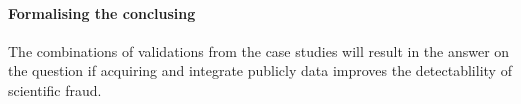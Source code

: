 \documentclass{ou-report}
\newcommand{\outline}[1]{{\color{blue} #1}}
\begin{document}
\paragraph{Formalising the conclusing}
The combinations of validations from the case studies will result in the
answer on the question if acquiring and integrate publicly data improves
the detectablility of scientific fraud.


    
    
    
    
    
    

    
\end{document}
